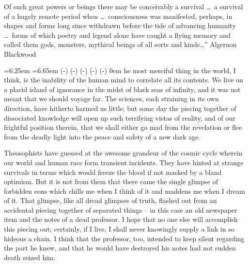 \beginblockquote
\noindent {}Of such great powers or beings there may be conceivably a survival⁠ \dots\ a survival of a hugely remote period when⁠ \dots\ consciousness was manifested, perhaps, in shapes and forms long since withdrawn before the tide of advancing humanity⁠ \dots\ forms of which poetry and legend alone have caught a flying memory and called them gods, monsters, mythical beings of all sorts and kinds⁠\dots”\hfil\break
\null\hfill Algernon Blackwood\par
\endblockquote
\vfil\break


\baselineskip
\noindent\leavevmode
{}
\baselineskip
{}=6.25em
=6.65em
	 \dimexpr(\hsize-)
	 \dimexpr(\hsize-)
	 \dimexpr(\hsize-)
	 \dimexpr(\hsize-)
	 \dimexpr(\hsize-)
	0em \hsize
\noindent
{\sc he most merciful thing} in the world, I think, is the inability of the human mind to correlate all its contents. We live on a placid island of ignorance in the midst of black seas of infinity, and it was not meant that we should voyage far. The sciences, each straining in its own direction, have hitherto harmed us little; but some day the piecing together of dissociated knowledge will open up such terrifying vistas of reality, and of our frightful position therein, that we shall either go mad from the revelation or flee from the deadly light into the peace and safety of a new dark age.

Theosophists have guessed at the awesome grandeur of the cosmic cycle wherein our world and human race form transient incidents. They have hinted at strange survivals in terms which would freeze the blood if not masked by a bland optimism. But it is not from them that there came the single glimpse of forbidden eons which chills me when I think of it and maddens me when I dream of it. That glimpse, like all dread glimpses of truth, flashed out from an accidental piecing together of separated things⁠ – in this case an old newspaper item and the notes of a dead professor. I hope that no one else will accomplish this piecing out; certainly, if I live, I shall never knowingly supply a link in so hideous a chain. I think that the professor, too, intended to keep silent regarding the part he knew, and that he would have destroyed his notes had not sudden death seized him.

